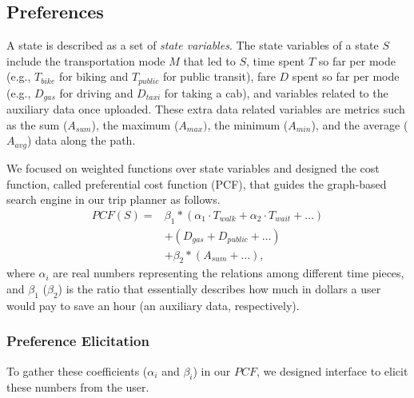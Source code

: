 \documentclass[letterpaper]{article}
\newcommand{\tit}[1]{\textit{#1}}
\newcommand{\PCF}{\mathit{PCF}}
\newcommand{\walk}{\mathit{walk}}
\newcommand{\bike}{\mathit{bike}}
\newcommand{\public}{\mathit{public}}
\newcommand{\taxi}{\mathit{taxi}}
\newcommand{\gas}{\mathit{gas}}
\newcommand{\wait}{\mathit{wait}}
\newcommand{\SUM}{\mathit{sum}}
\newcommand{\MAX}{\mathit{max}}
\newcommand{\MIN}{\mathit{min}}
\newcommand{\AVG}{\mathit{avg}}
\begin{document}
\subsection{Preferences}

A state is described as a set of \tit{state variables}.
The state variables of a state $S$ include the transportation mode $M$ that led to $S$,
time spent $T$ so far per mode (e.g., $T_\bike$ for biking and $T_\public$ for
public transit), fare $D$ spent so far per mode (e.g., $D_\gas$ for driving and
$D_\taxi$ for taking a cab), and variables related to the auxiliary data once uploaded.
These extra data related variables are metrics such as the sum ($A_\SUM$),
the maximum ($A_\MAX)$, the minimum ($A_\MIN$), and the average ($A_\AVG$) data along the path.

We focused on weighted functions over state variables and
designed the cost function, called preferential cost function (PCF), that guides the
graph-based search engine in our trip planner as follows.
\begin{equation}
	\begin{aligned}
		\PCF(S) =& \beta_1 * (\alpha_1 \cdot T_\walk + \alpha_2 \cdot T_\wait + \ldots) \\
								&+ (D_\gas + D_\public + \ldots) \\
								&+ \beta_2 * (A_\SUM + \ldots),
	\end{aligned}
\end{equation}
where $\alpha_i$ are real numbers representing the relations among different time pieces,
and $\beta_1$ ($\beta_2$) is the ratio that essentially describes how much in dollars a user would pay to
save an hour (an auxiliary data, respectively).

\subsubsection{Preference Elicitation}
To gather these coefficients ($\alpha_i$ and $\beta_i$) in our $\PCF$, we designed interface to
elicit these numbers from the user.
\end{document}
